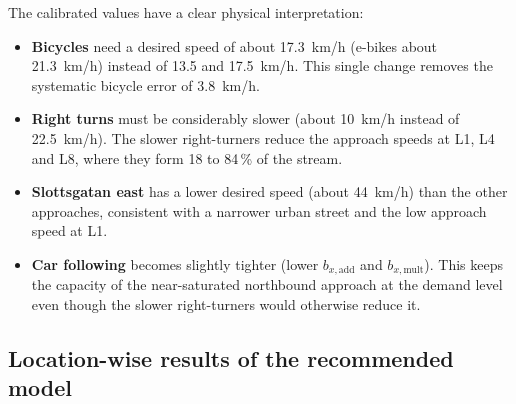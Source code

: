 \documentclass[11pt,a4paper]{article}
\newcommand{\kmh}{~km/h}
\begin{document}
The calibrated values have a clear physical interpretation:
\begin{itemize}
  \item \textbf{Bicycles} need a desired speed of about 17.3\kmh{} (e-bikes about 21.3\kmh) instead
        of 13.5 and 17.5\kmh. This single change removes the systematic bicycle error of 3.8\kmh.
  \item \textbf{Right turns} must be considerably slower (about 10\kmh{} instead of 22.5\kmh). The
        slower right-turners reduce the approach speeds at L1, L4 and L8, where they form 18 to
        84\,\% of the stream.
  \item \textbf{Slottsgatan east} has a lower desired speed (about 44\kmh) than the other
        approaches, consistent with a narrower urban street and the low approach speed at L1.
  \item \textbf{Car following} becomes slightly tighter (lower $b_{x,\mathrm{add}}$ and
        $b_{x,\mathrm{mult}}$). This keeps the capacity of the near-saturated northbound approach at
        the demand level even though the slower right-turners would otherwise reduce it.
\end{itemize}

\subsection{Location-wise results of the recommended model}
\end{document}
